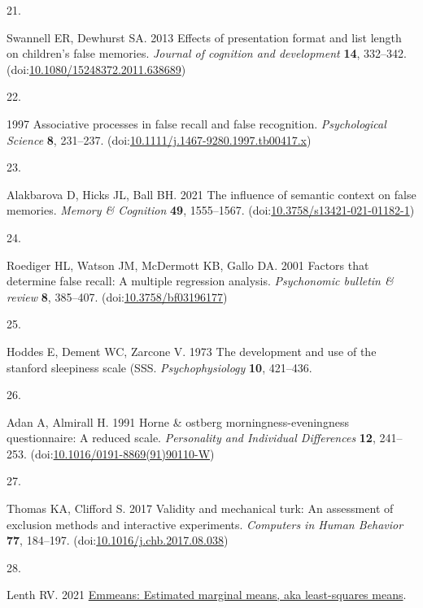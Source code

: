 \documentclass[
]{article}
\newlength{\cslhangindent}
\newlength{\csllabelwidth}
\newlength{\cslentryspacingunit} %
\newenvironment{CSLReferences}[2] %
 {%
  \setlength{\parindent}{0pt}
  \ifodd #1
  \let\oldpar\par
  \def\par{\hangindent=\cslhangindent\oldpar}
  \fi
  \setlength{\parskip}{#2\cslentryspacingunit}
 }%
 {}
\newcommand{\CSLLeftMargin}[1]{\parbox[t]{\csllabelwidth}{#1}}
\newcommand{\CSLRightInline}[1]{\parbox[t]{\linewidth - \csllabelwidth}{#1}\break}
\begin{document}
\begin{CSLReferences}{0}{0}
\leavevmode{}%
\CSLLeftMargin{21. }%
\CSLRightInline{Swannell ER, Dewhurst SA. 2013 Effects of presentation format and list length on children's false memories. \emph{Journal of cognition and development} \textbf{14}, 332--342. (doi:\href{https://doi.org/10.1080/15248372.2011.638689}{10.1080/15248372.2011.638689})}

\leavevmode{}%
\CSLLeftMargin{22. }%
\CSLRightInline{1997 Associative processes in false recall and false recognition. \emph{Psychological Science} \textbf{8}, 231--237. (doi:\href{https://doi.org/10.1111/j.1467-9280.1997.tb00417.x}{10.1111/j.1467-9280.1997.tb00417.x})}

\leavevmode{}%
\CSLLeftMargin{23. }%
\CSLRightInline{Alakbarova D, Hicks JL, Ball BH. 2021 The influence of semantic context on false memories. \emph{Memory \& Cognition} \textbf{49}, 1555--1567. (doi:\href{https://doi.org/10.3758/s13421-021-01182-1}{10.3758/s13421-021-01182-1})}

\leavevmode{}%
\CSLLeftMargin{24. }%
\CSLRightInline{Roediger HL, Watson JM, McDermott KB, Gallo DA. 2001 Factors that determine false recall: A multiple regression analysis. \emph{Psychonomic bulletin \& review} \textbf{8}, 385--407. (doi:\href{https://doi.org/10.3758/bf03196177}{10.3758/bf03196177})}

\leavevmode{}%
\CSLLeftMargin{25. }%
\CSLRightInline{Hoddes E, Dement WC, Zarcone V. 1973 The development and use of the stanford sleepiness scale (SSS. \emph{Psychophysiology} \textbf{10}, 421--436.}

\leavevmode{}%
\CSLLeftMargin{26. }%
\CSLRightInline{Adan A, Almirall H. 1991 Horne \& ostberg morningness-eveningness questionnaire: A reduced scale. \emph{Personality and Individual Differences} \textbf{12}, 241--253. (doi:\href{https://doi.org/10.1016/0191-8869(91)90110-W}{10.1016/0191-8869(91)90110-W})}

\leavevmode{}%
\CSLLeftMargin{27. }%
\CSLRightInline{Thomas KA, Clifford S. 2017 Validity and mechanical turk: An assessment of exclusion methods and interactive experiments. \emph{Computers in Human Behavior} \textbf{77}, 184--197. (doi:\href{https://doi.org/10.1016/j.chb.2017.08.038}{10.1016/j.chb.2017.08.038})}

\leavevmode{}%
\CSLLeftMargin{28. }%
\CSLRightInline{Lenth RV. 2021 \href{https://CRAN.R-project.org/package=emmeans}{Emmeans: Estimated marginal means, aka least-squares means}. }


\end{CSLReferences}
\end{document}
